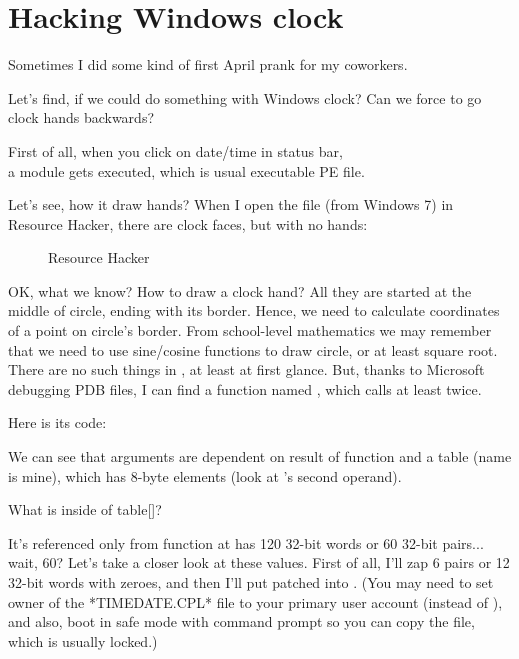 \section{Hacking Windows clock}

Sometimes I did some kind of first April prank for my coworkers.

Let's find, if we could do something with Windows clock?
Can we force to go clock hands backwards?

First of all, when you click on date/time in status bar,\\
a  module gets executed,
which is usual executable PE file.

Let's see, how it draw hands?
When I open the file (from Windows 7) in Resource Hacker, there are clock faces, but with no hands:

\begin{figure}[H]
\centering
{}
\caption{Resource Hacker}
\end{figure}

OK, what we know? How to draw a clock hand? All they are started at the middle of circle, ending with its border.
Hence, we need to calculate coordinates of a point on circle's border.
From school-level mathematics we may remember that we need to use sine/cosine functions to draw circle, or at least
square root.
There are no such things in , at least at first glance.
But, thanks to Microsoft debugging PDB files, I can find a function named , which calls
 at least twice.

Here is its code:



We can see that  arguments are dependent on result of  function
and a  table (name is mine),
which has 8-byte elements (look at 's second operand).

What is inside of table[]?



It's referenced only from  function at has 120 32-bit words or 60 32-bit pairs... wait, 60?
Let's take a closer look at these values.
First of all, I'll zap 6 pairs or 12 32-bit words with zeroes, and then I'll put patched 
into .
(You may need to set owner of the *TIMEDATE.CPL* file to your primary user account (instead of ),
and also, boot in safe mode with command prompt so you can copy the file, which is usually locked.)

